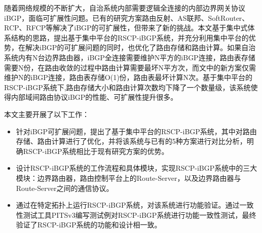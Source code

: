 \begin{cabstract}
  随着网络规模的不断扩大，自治系统内部需要逻辑全连接的内部边界网关协议iBGP，面临可扩展性问题。已有的研究方案路由反射、AS联邦、SoftRouter、RCP、RFCP等解决了iBGP的可扩展性，但带来了新的挑战。本文基于集中式体系结构的思路，提出基于集中平台的RSCP-iBGP系统，并充分利用集中平台的优势，在解决iBGP的可扩展问题的同时，也优化了路由存储和路由计算。如果自治系统内有N台边界路由器，iBGP全连接需要维护N平方的iBGP连接，路由表存储需要N份，在路由收敛的过程中路由计算需要最坏N平方次，而文中的新方案仅需维护N的iBGP连接，路由表存储O(1)份，路由表最坏计算N次。基于集中平台的RSCP-iBGP系统下,路由存储大小和路由计算次数均下降了一个数量级，该系统使得内部域间路由协议iBGP的性能、可扩展性提升很多。

  本文主要开展了以下工作：
  \begin{itemize}
    \item 针对iBGP可扩展问题，提出了基于集中平台的RSCP-iBGP系统，其中对路由存储、路由计算进行了优化，并将该系统与已有的5种方案进行对比分析，明确RSCP-iBGP系统相比于现有研究方案的优势。
    \item 设计RSCP-iBGP系统的工作流程和具体模块，实现RSCP-iBGP系统中的三大模块：边界路由器，路由控制平台上的Route-Server，以及边界路由器与Route-Server之间的通信协议。
    \item 通过在特定拓扑上运行RSCP-iBGP系统，对该系统进行功能验证。通过一致性测试工具PITSv3编写测试例对RSCP-iBGP系统进行功能一致性测试，最终验证了RSCP-iBGP系统的功能和设计相一致。
  \end{itemize}

\end{cabstract}


